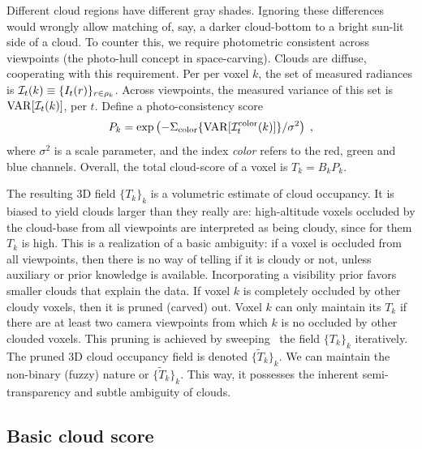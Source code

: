\documentclass[runningheads]{llncs}
\begin{document}
Different cloud regions have different gray shades. Ignoring these differences would wrongly allow matching of, say, a darker cloud-bottom to a bright sun-lit side of a cloud. To counter this, we require photometric consistent across viewpoints (the photo-hull concept in space-carving). Clouds are diffuse, cooperating with this requirement. Per per voxel $k$, the set of measured radiances is \mbox{${\cal I}_t(k)\equiv\{I_t(r)\}_{r\in\rho_k}$}. Across viewpoints, the measured variance of this set is ${\rm VAR}[{\cal I}_t(k)]$, per $t$. Define a photo-consistency score
\begin{equation}
 P_k= \exp\left(
         -\Sigma_{\rm color}\{{\rm VAR}[{\cal I}_t^{\rm color}(k)]\}/\sigma^2
         \right)
  \;,
 \label{eq:Ak}
\end{equation}
where $\sigma^2$ is a scale parameter, and the index {\em color} refers to the red, green and blue channels. Overall, the total cloud-score of a voxel is $T_k=B_kP_k$.

The resulting 3D field $\{T_k\}_k$ is a volumetric estimate of cloud occupancy. It is biased to yield clouds larger than they really are: high-altitude voxels occluded by the cloud-base from all viewpoints are interpreted as being cloudy, since for them $T_k$ is high. This is a realization of a basic ambiguity: if a voxel is occluded from all viewpoints, then there is no way of telling if it is cloudy or not, unless auxiliary or prior knowledge is available. Incorporating a visibility prior favors smaller clouds that explain the data. If voxel $k$ is completely occluded by other cloudy voxels, then it is pruned (carved) out. Voxel $k$ can only maintain its $T_k$ if there are at least two camera viewpoints from which $k$ is no occluded by other clouded voxels. This pruning is achieved by sweeping~\cite{Kutulakos2000} the field $\{T_k\}_k$ iteratively. The pruned 3D cloud occupancy field is denoted $\{\tilde T_k\}_k$. We can maintain the non-binary (fuzzy) nature or $\{\tilde T_k\}_k$. This way, it possesses the inherent semi-transparency and subtle ambiguity of clouds.

\subsection*{Basic cloud score}
\label{sec:cloudscore}
\end{document}
